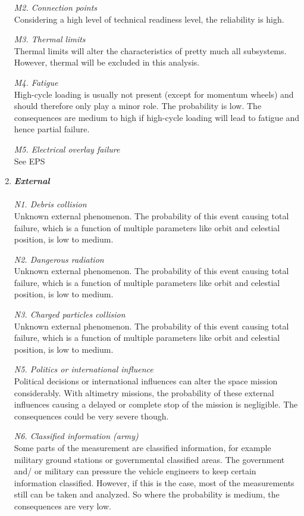 \begin{enumerate}[A]
\textit{M2. Connection points}\\ 
Considering a high level of technical readiness level, the reliability is high.

\textit{M3. Thermal limits}\\ 
Thermal limits will alter the characteristics of pretty much all subsystems. However, thermal will be excluded in this analysis.

\textit{M4. Fatigue}\\ 
High-cycle loading is usually not present (except for momentum wheels) and should therefore only play a minor role. The probability is low. The consequences are medium to high if high-cycle loading will lead to fatigue and hence partial failure.

\textit{M5. Electrical overlay failure}\\ 
See EPS

	\item\textbf{\textit{External}} \\\\
\textit{N1. Debris collision}\\ 
Unknown external phenomenon. The probability of this event causing total failure, which is a function of multiple parameters like orbit and celestial position, is low to medium. 

\textit{N2. Dangerous radiation}\\ 
Unknown external phenomenon. The probability of this event causing total failure, which is a function of multiple parameters like orbit and celestial position, is low to medium. 

\textit{N3. Charged particles collision}\\ 
Unknown external phenomenon. The probability of this event causing total failure, which is a function of multiple parameters like orbit and celestial position, is low to medium. 

\textit{N5. Politics or international influence}\\ 
Political decisions or international influences can alter the space mission considerably.  With altimetry missions, the probability of these external influences causing a delayed or complete stop of the mission is negligible. The consequences could be very severe though. 

\textit{N6. Classified information (army)}\\ 
Some parts of the measurement are classified information, for example military ground stations or governmental classified areas. The government and/ or military can pressure the vehicle engineers to keep certain information classified. However, if this is the case, most of the measurements still can be taken and analyzed. So where the probability is medium, the consequences are very low.


\end{enumerate}
